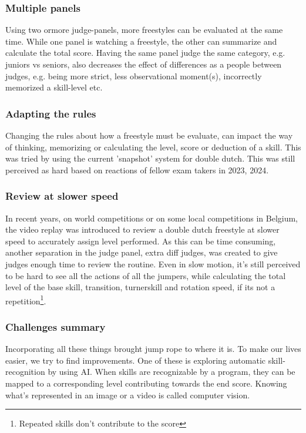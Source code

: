 \subsubsection{Multiple panels}
Using two ormore judge-panels, more freestyles can be evaluated at the same time. While one
panel is watching a freestyle, the other can summarize and calculate the total score. Having the same panel judge the same category, e.g. juniors vs seniors, also decreases the effect of differences as a people between judges, e.g. being more strict, less observational moment(s), incorrectly memorized a skill-level etc.

\subsubsection{Adapting the rules}
Changing the rules about how a freestyle must be evaluate, can impact the way of thinking, memorizing or calculating the level, score or deduction of a skill. This was tried by using the current 'snapshot' system for double dutch. This was still perceived as hard based on reactions of fellow exam takers in 2023, 2024.

\subsubsection{Review at slower speed}
In recent years, on world competitions or on some local competitions in Belgium, the video
replay was introduced to review a double dutch freestyle at slower speed to accurately assign level performed.
As this can be time consuming, another separation in the judge panel, extra diff
judges, was created to give judges enough time to review the routine. Even in slow motion, it’s still perceived to be hard to see all the actions of all the jumpers, while calculating the total level of the base skill, transition, turnerskill and rotation speed, if its not a repetition\footnote{Repeated skills don't contribute to the score}.


\subsubsection{Challenges summary}
Incorporating all these things brought jump rope to where it is. To make our lives easier, we try to find improvements. One of these is exploring automatic skill-recognition by using AI. When skills are recognizable by a program, they can be mapped to a corresponding level contributing towards the end score. Knowing what's represented in an image or a video is called computer vision. %

